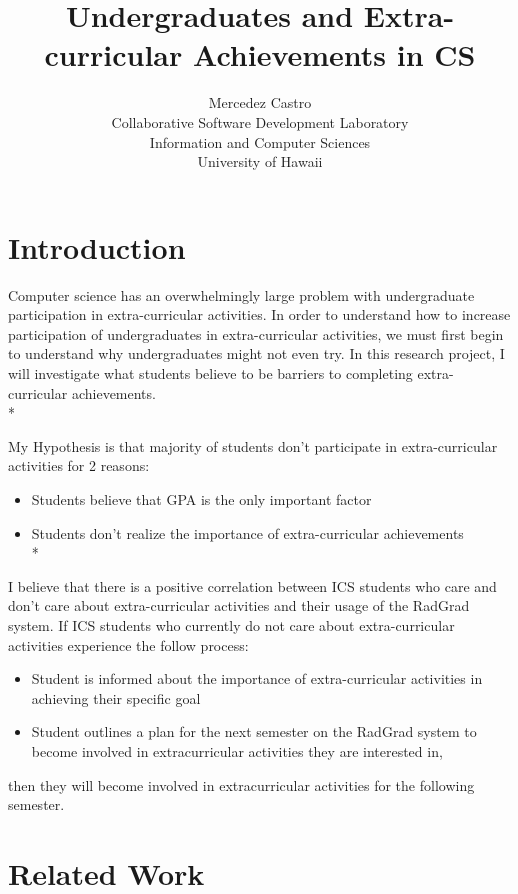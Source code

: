 \documentclass[english]{proposalnsf}
\title{Undergraduates and Extra-curricular Achievements in CS}
\author{Mercedez Castro \\Collaborative Software Development Laboratory \\ Information and Computer Sciences \\ University of Hawaii}
\begin{document}
  \maketitle
  \tableofcontents
  \newpage

  \section{Introduction}
  \label{introduction}

  Computer science has an overwhelmingly large problem with undergraduate participation in extra-curricular activities.
  In order to understand how to increase participation of undergraduates in extra-curricular activities, we must first begin to understand why undergraduates might not even try.
  In this research project, I will investigate what students believe to be barriers to completing extra-curricular achievements.\\*

  My Hypothesis is that majority of students don't participate in extra-curricular activities for 2 reasons:
  \begin{itemize}
    \item Students believe that GPA is the only important factor
    \item Students don't realize the importance of extra-curricular achievements\\*
  \end{itemize}

  I believe that there is a positive correlation between ICS students who care and don't care about extra-curricular activities and their usage of the RadGrad system.
  If ICS students who currently do not care about extra-curricular activities experience the follow process:
  \begin{itemize}
    \item Student is informed about the importance of extra-curricular activities in achieving their specific goal
    \item Student outlines a plan for the next semester on the RadGrad system to become involved in extracurricular activities they are interested in,
  \end{itemize}
  then they will become involved in extracurricular activities for the following semester.

  \section{Related Work}
  \label{related-work}
\end{document}

